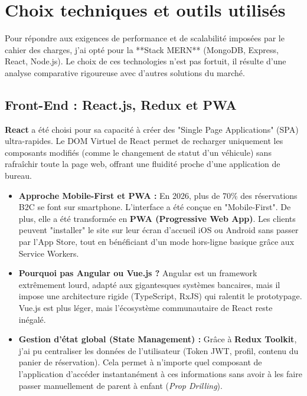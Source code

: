 \chapter{Choix techniques et outils utilisés}

Pour répondre aux exigences de performance et de scalabilité imposées par le cahier des charges, j'ai opté pour la **Stack MERN** (MongoDB, Express, React, Node.js). Le choix de ces technologies n'est pas fortuit, il résulte d'une analyse comparative rigoureuse avec d'autres solutions du marché.

\section{Front-End : React.js, Redux et PWA}
\textbf{React} a été choisi pour sa capacité à créer des "Single Page Applications" (SPA) ultra-rapides. Le DOM Virtuel de React permet de recharger uniquement les composants modifiés (comme le changement de statut d'un véhicule) sans rafraîchir toute la page web, offrant une fluidité proche d'une application de bureau.
\begin{itemize}
    \item \textbf{Approche Mobile-First et PWA :} En 2026, plus de 70\% des réservations B2C se font sur smartphone. L'interface a été conçue en "Mobile-First". De plus, elle a été transformée en \textbf{PWA (Progressive Web App)}. Les clients peuvent "installer" le site sur leur écran d'accueil iOS ou Android sans passer par l'App Store, tout en bénéficiant d'un mode hors-ligne basique grâce aux Service Workers.
    \item \textbf{Pourquoi pas Angular ou Vue.js ?} Angular est un framework extrêmement lourd, adapté aux gigantesques systèmes bancaires, mais il impose une architecture rigide (TypeScript, RxJS) qui ralentit le prototypage. Vue.js est plus léger, mais l'écosystème communautaire de React reste inégalé.
    \item \textbf{Gestion d'état global (State Management) :} Grâce à \textbf{Redux Toolkit}, j'ai pu centraliser les données de l'utilisateur (Token JWT, profil, contenu du panier de réservation). Cela permet à n'importe quel composant de l'application d'accéder instantanément à ces informations sans avoir à les faire passer manuellement de parent à enfant (\textit{Prop Drilling}).
\end{itemize}

